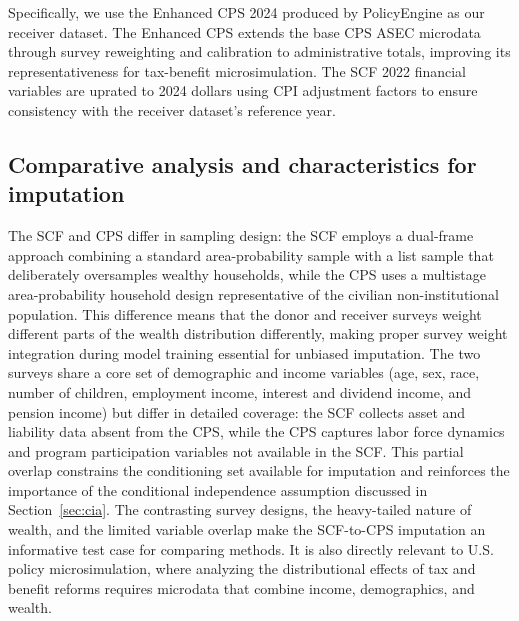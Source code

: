 Specifically, we use the Enhanced CPS 2024 produced by PolicyEngine \citep{policyengine_us} as our receiver dataset. The Enhanced CPS extends the base CPS ASEC microdata through survey reweighting and calibration to administrative totals, improving its representativeness for tax-benefit microsimulation. The SCF 2022 financial variables are uprated to 2024 dollars using CPI adjustment factors to ensure consistency with the receiver dataset's reference year.

\subsection{Comparative analysis and characteristics for imputation}

The SCF and CPS differ in sampling design: the SCF employs a dual-frame approach combining a standard area-probability sample with a list sample that deliberately oversamples wealthy households, while the CPS uses a multistage area-probability household design representative of the civilian non-institutional population. This difference means that the donor and receiver surveys weight different parts of the wealth distribution differently, making proper survey weight integration during model training essential for unbiased imputation. The two surveys share a core set of demographic and income variables (age, sex, race, number of children, employment income, interest and dividend income, and pension income) but differ in detailed coverage: the SCF collects asset and liability data absent from the CPS, while the CPS captures labor force dynamics and program participation variables not available in the SCF. This partial overlap constrains the conditioning set available for imputation and reinforces the importance of the conditional independence assumption discussed in Section~\ref{sec:cia}. The contrasting survey designs, the heavy-tailed nature of wealth, and the limited variable overlap make the SCF-to-CPS imputation an informative test case for comparing methods. It is also directly relevant to U.S. policy microsimulation, where analyzing the distributional effects of tax and benefit reforms requires microdata that combine income, demographics, and wealth.